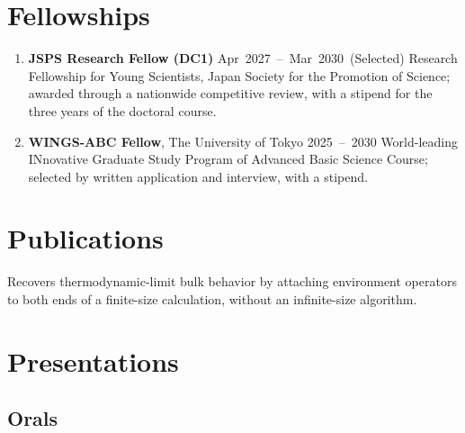 \documentclass[11pt]{article} %
\begin{document}
\section{Fellowships}
\begin{enumerate}[label=\null, left=0pt..0pt, itemsep=2pt]
	\item {\bfseries JSPS Research Fellow (DC1)} \hfill \mbox{Apr 2027 -- Mar 2030 (Selected)} \newline
	Research Fellowship for Young Scientists, Japan Society for the Promotion of Science; awarded through a nationwide competitive review, with a stipend for the three years of the doctoral course.
	\item {\bfseries WINGS-ABC Fellow}, The University of Tokyo \hfill \mbox{2025 -- 2030} \newline
	World-leading INnovative Graduate Study Program of Advanced Basic Science Course; selected by written application and interview, with a stipend.
\end{enumerate}

\section{Publications}
\begin{enumerate}[series=cvrefs, label={[\arabic*]}, left=0pt..\parindent, itemsep=2pt]
	\item {} \newline
	Recovers thermodynamic-limit bulk behavior by attaching environment operators to both ends of a finite-size calculation, without an infinite-size algorithm.
\end{enumerate}

\section{Presentations}
\subsection{Orals}
\begin{enumerate}[resume=cvrefs, label={[\arabic*]}, left=0pt..\parindent, itemsep=2pt]
	\item {}
	\item {}
\end{enumerate}
\end{document}
